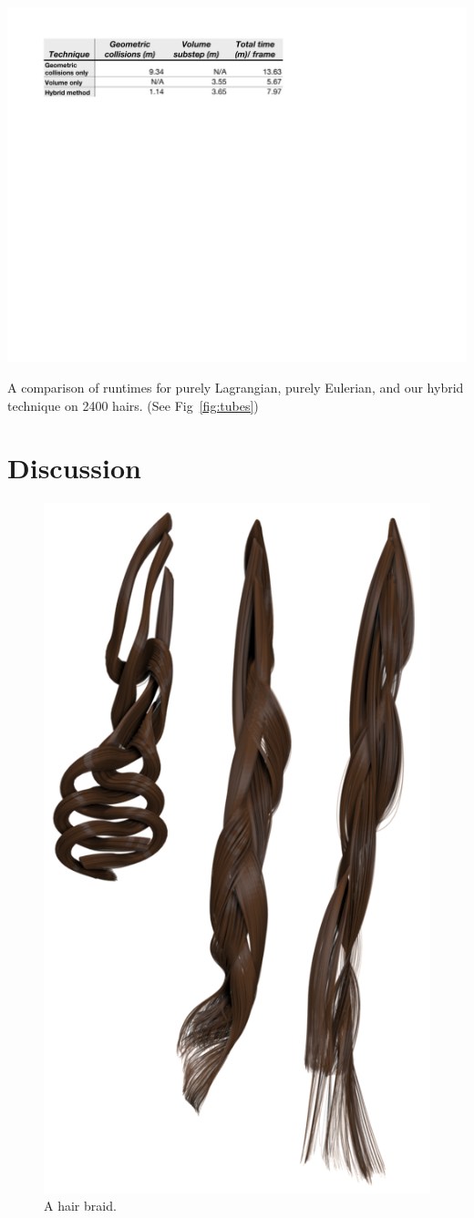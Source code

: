 \begin{table}[b!]
 \centering \includegraphics[width=.9\linewidth]{hair/figures/tube_times}
 \caption[Runtime comparison of collision algorithms.]{\label{table:tubes} A comparison of runtimes 
for purely Lagrangian,
   purely Eulerian, and our hybrid technique on 2400 hairs. (See Fig~\ref{fig:tubes})} 
\end{table}

\section{Discussion}

\begin{figure}[t]
\centering
\includegraphics[width=.45\columnwidth]{hair/images/braidfigurenew}
\caption{A hair braid.}\label{fig:braid}
\end{figure}

